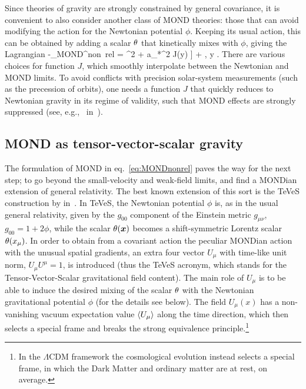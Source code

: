 Since theories of gravity are strongly constrained by general covariance, 
it is convenient to also consider another class of MOND theories: those that can avoid modifying the action for the Newtonian potential $\phi$.
Keeping its usual action, this can be obtained by
adding a scalar $\theta$ that kinetically mixes with $\phi$, giving the Lagrangian 
\beq\label{eq:MONDnonrel}
 -\Lag _{\rm MOND}^{\rm non~rel} 
= \left[ [\vec\nabla (\phi -\mond)]^2 +  a_*^2 J(y) \right] + \phi \rho,\qquad
y \equiv  {}.\eeq
There are various choices for function $J$, which smoothly interpolate between the Newtonian and MOND limits.
To avoid conflicts with precision solar-system measurements (such as the precession of orbits), 
one needs a function $J$ that quickly reduces to Newtonian gravity in its regime of validity,
such that MOND effects are strongly suppressed
(see, e.g.,\  in~\cite{MONDth}).


\subsection{MOND as tensor-vector-scalar gravity}
The formulation of MOND in eq.~\eqref{eq:MONDnonrel} paves the way for the next step; to go beyond the small-velocity and weak-field limits,
and find a MONDian extension of general relativity.
The best known extension of this sort is the TeVeS construction by  in~\cite{MONDth}.
In TeVeS, the Newtonian potential $\phi$ is, as in the usual general relativity,  given by the $g_{00}$ component of the  Einstein metric $g_{\mu\nu}$, 
$g_{00} = 1+2\phi$, while the scalar $\theta (\bm{x})$ becomes a shift-symmetric Lorentz scalar $\theta (x_\mu)$.
In order to obtain from a covariant action the peculiar MONDian action with the unusual spatial gradients,
an extra four vector $U_\mu$ with time-like unit norm, $U_\mu U^\mu=1$,  is introduced
(thus the TeVeS acronym, which stands for the Tensor-Vector-Scalar gravitational field content).
The main role of $U_\mu$ is to be able to induce the desired mixing of
the scalar $\theta$ with the Newtonian gravitational potential $\phi$
(for the details see below).
The field $U_\mu(x)$ has a non-vanishing vacuum expectation value $\langle U_\mu\rangle$  along the time direction, which then
selects a special frame and
breaks the strong equivalence principle.\footnote{In the $\Lambda$CDM framework the cosmological evolution instead selects a special frame, in which the Dark Matter and ordinary matter are at rest, on average.}



